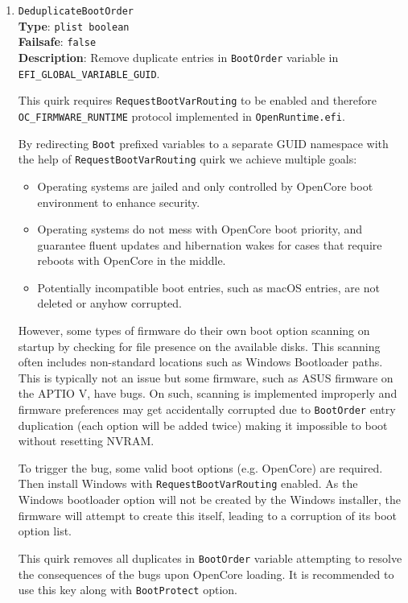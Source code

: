 \documentclass[]{article}
\providecommand{\tightlist}{%
  \setlength{\itemsep}{0pt}\setlength{\parskip}{0pt}}
\begin{document}
\begin{enumerate}

\item
  \texttt{DeduplicateBootOrder}\\
  \textbf{Type}: \texttt{plist\ boolean}\\
  \textbf{Failsafe}: \texttt{false}\\
  \textbf{Description}: Remove duplicate entries in \texttt{BootOrder} variable
  in \texttt{EFI\_GLOBAL\_VARIABLE\_GUID}.

  This quirk requires \texttt{RequestBootVarRouting} to be enabled and therefore
  \texttt{OC\_FIRMWARE\_RUNTIME} protocol implemented in \texttt{OpenRuntime.efi}.

  By redirecting \texttt{Boot} prefixed variables to a separate GUID namespace
  with the help of \texttt{RequestBootVarRouting} quirk we achieve multiple goals:
  \begin{itemize}
  \tightlist
  \item Operating systems are jailed and only controlled by OpenCore boot
  environment to enhance security.
  \item Operating systems do not mess with OpenCore boot priority, and guarantee
  fluent updates and hibernation wakes for cases that require reboots with OpenCore
  in the middle.
  \item Potentially incompatible boot entries, such as macOS entries, are not deleted
  or anyhow corrupted.
  \end{itemize}

  However, some types of firmware do their own boot option scanning on startup by checking
  for file presence on the available disks. This scanning often includes non-standard
  locations such as Windows Bootloader paths. This is typically not an issue but some
  firmware, such as ASUS firmware on the APTIO V, have bugs. On such, scanning is
  implemented improperly and firmware preferences may get accidentally corrupted
  due to \texttt{BootOrder} entry duplication (each option will be added twice) making
  it impossible to boot without resetting NVRAM.

  To trigger the bug, some valid boot options (e.g. OpenCore) are required. Then
  install Windows with \texttt{RequestBootVarRouting} enabled. As the Windows bootloader
  option will not be created by the Windows installer, the firmware will attempt to create
  this itself, leading to a corruption of its boot option list.

  This quirk removes all duplicates in \texttt{BootOrder} variable attempting to resolve
  the consequences of the bugs upon OpenCore loading. It is recommended to use this key
  along with \texttt{BootProtect} option.


\end{enumerate}
\end{document}

